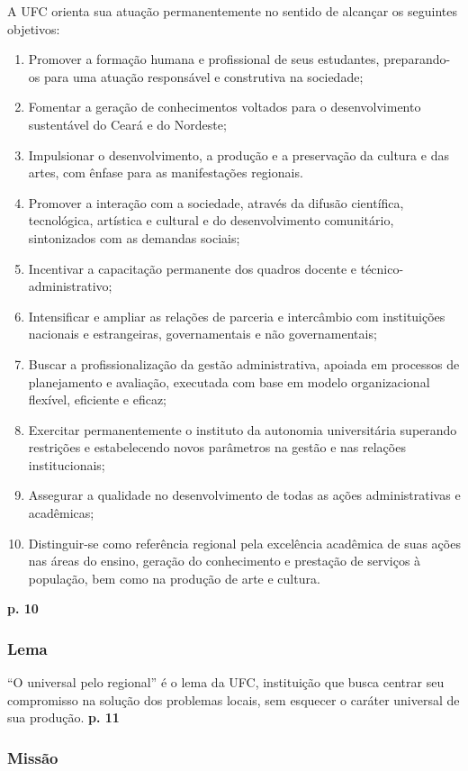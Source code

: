 \documentclass{article}
\begin{document}
A UFC orienta sua atuação permanentemente no sentido de alcançar os seguintes objetivos:
\begin{enumerate}
\item
Promover a formação humana e profissional de seus estudantes, preparando-os para uma atuação responsável e construtiva na sociedade;
\item
Fomentar a geração de conhecimentos voltados para o desenvolvimento sustentável do Ceará e do Nordeste;
\item
Impulsionar o desenvolvimento, a produção e a preservação da cultura e das artes, com ênfase para as manifestações regionais.
\item
Promover a interação com a sociedade, através da difusão científica, tecnológica, artística e cultural e do desenvolvimento comunitário, sintonizados com as demandas sociais;
\item
Incentivar a capacitação permanente dos quadros docente e técnico-administrativo;
\item
Intensificar e ampliar as relações de parceria e intercâmbio com instituições nacionais e estrangeiras, governamentais e não governamentais;
\item
Buscar a profissionalização da gestão administrativa, apoiada em processos de planejamento e avaliação, executada com base em modelo organizacional flexível, eficiente e eficaz;
\item
Exercitar permanentemente o instituto da autonomia universitária superando restrições e estabelecendo novos parâmetros na gestão e nas relações institucionais;
\item
Assegurar a qualidade no desenvolvimento de todas as ações administrativas e acadêmicas;
\item
Distinguir-se como referência regional pela excelência acadêmica de suas ações nas áreas do ensino, geração do conhecimento e prestação de serviços à população, bem como na produção de arte e cultura.
\end{enumerate}
\textbf{p. 10}

\subsubsection*{Lema}

“O universal pelo regional” é o lema da UFC, instituição que busca centrar seu compromisso na solução dos problemas locais, sem esquecer o caráter universal de sua produção.
\textbf{p. 11}

\subsubsection*{Missão}
\end{document}
